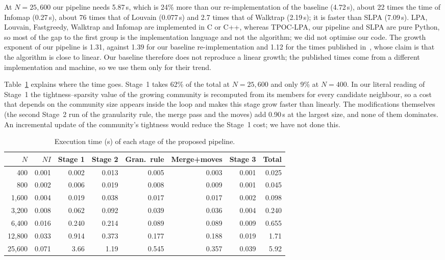 \documentclass[conference]{IEEEtran}
\begin{document}
At $N=25,600$ our pipeline needs 5.87\,s, which is 24\% more than our re-implementation of the baseline (4.72\,s), about 22 times the time of Infomap (0.27\,s), about 76 times that of Louvain (0.077\,s) and 2.7 times that of Walktrap (2.19\,s); it is faster than SLPA (7.09\,s). LPA, Louvain, Fastgreedy, Walktrap and Infomap are implemented in C or C++, whereas TPOC-LPA, our pipeline and SLPA are pure Python, so most of the gap to the first group is the implementation language and not the algorithm; we did not optimise our code. The growth exponent of our pipeline is 1.31, against 1.39 for our baseline re-implementation and 1.12 for the times published in~\cite{kong2026}, whose claim is that the algorithm is close to linear. Our baseline therefore does not reproduce a linear growth; the published times come from a different implementation and machine, so we use them only for their trend.

Table~\ref{tab:stage} explains where the time goes. Stage~1 takes 62\% of the total at $N=25,600$ and only 9\% at $N=400$. In our literal reading of Stage~1 the tightness--sparsity value of the growing community is recomputed from its members for every candidate neighbour, so a cost that depends on the community size appears inside the loop and makes this stage grow faster than linearly. The modifications themselves (the second Stage~2 run of the granularity rule, the merge pass and the moves) add 0.90\,s at the largest size, and none of them dominates. An incremental update of the community's tightness would reduce the Stage~1 cost; we have not done this.

\begin{table}[!htbp]
\centering
\caption{Execution time (s) of each stage of the proposed pipeline.}
\label{tab:stage}
\scriptsize\setlength{\tabcolsep}{3pt}
\begin{tabular}{rrrrrrrr}
\toprule
$N$ & $NI$ & Stage 1 & Stage 2 & Gran.\ rule & Merge+moves & Stage 3 & Total \\
\midrule
400 & 0.001 & 0.002 & 0.013 & 0.005 & 0.003 & 0.001 & 0.025 \\
800 & 0.002 & 0.006 & 0.019 & 0.008 & 0.009 & 0.001 & 0.045 \\
1{,}600 & 0.004 & 0.019 & 0.038 & 0.017 & 0.017 & 0.002 & 0.098 \\
3{,}200 & 0.008 & 0.062 & 0.092 & 0.039 & 0.036 & 0.004 & 0.240 \\
6{,}400 & 0.016 & 0.240 & 0.214 & 0.089 & 0.089 & 0.009 & 0.655 \\
12{,}800 & 0.033 & 0.914 & 0.373 & 0.177 & 0.188 & 0.019 & 1.71 \\
25{,}600 & 0.071 & 3.66 & 1.19 & 0.545 & 0.357 & 0.039 & 5.92 \\
\bottomrule
\end{tabular}
\end{table}
\end{document}
